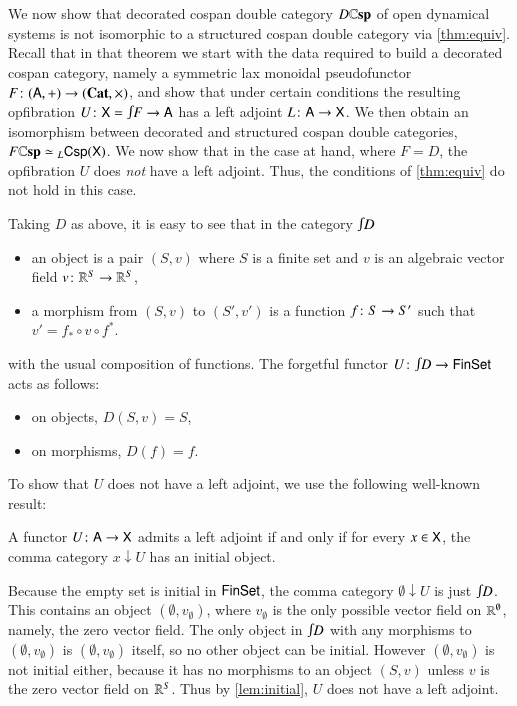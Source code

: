 \documentclass[reqno]{amsart}
\begin{document}
We now show that decorated cospan double category $D \mathbf{\mathbb Csp}$ of open dynamical systems is not isomorphic to a structured cospan double category via \cref{thm:equiv}.  Recall that in that theorem we start with the data required to build a decorated cospan category, namely a symmetric lax monoidal pseudofunctor $F \colon (\mathsf{A},+) \to (\mathbf{Cat},\times)$, and show that under certain conditions the resulting opfibration $U \maps \X = \inta F \to \A$ has a left adjoint $L \colon \mathsf{A} \to \mathsf{X}$.   We then obtain an isomorphism between decorated and structured cospan double categories, $F \mathbf{\mathbb Csp} \simeq {}_L \mathsf{Csp}(\mathsf{X})$.   We now show that in the case at hand, where $F = D$,  the opfibration $U$ does \emph{not} have a left adjoint.  Thus, the conditions of \cref{thm:equiv} do not hold in this case.

Taking $D$ as above, it is easy to see that in the category $\inta D$
\begin{itemize}
\item an object is a pair $(S,v)$ where $S$ is a finite set and $v$ is an algebraic vector field $v \colon \mathbb{R}^S \to \mathbb{R}^S$,
\item a morphism from $(S,v)$ to $(S',v')$ is a function $f \colon S \to S'$ such that $v' = f_* \circ v \circ f^*$.
\end{itemize}
with the usual composition of functions.   The forgetful functor $U \maps \inta D \to \Fin\Set$ acts as follows:
\begin{itemize}
\item on objects, $D(S,v) = S$,
\item on morphisms, $D(f) = f$.
\end{itemize}

To show that $U$ does not have a left adjoint, we use the following well-known result:
\begin{lem} \label{lem:initial}
A functor $U \colon \mathsf{A} \to \mathsf{X}$ admits a left adjoint if and only if for every $x \in \mathsf{X}$, the comma category $x \downarrow U$ has an initial object.
\end{lem}
Because the empty set is initial in $\mathsf{Fin}\mathsf{Set}$, the comma category 
$\emptyset \downarrow U$ is just $\inta D$.  This contains an object $(\emptyset, v_\emptyset)$, where $v_\emptyset$ is the only possible vector field on $\mathbb{R}^\emptyset$, namely, the zero vector field.   The only object in $\inta D$ with any morphisms to $(\emptyset, v_\emptyset)$ is $(\emptyset, v_\emptyset)$ itself, so no other object can be initial.  However $(\emptyset, v_\emptyset)$ is not initial either, because it has no morphisms to an object $(S,v)$ unless $v$ is the zero vector field on $\mathbb{R}^S$.  Thus by \cref{lem:initial}, $U$ does not have a left adjoint.
\end{document}

